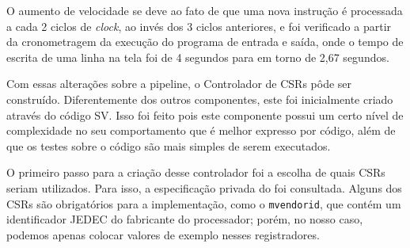 \documentclass[
	12pt,				%
	openright,			%
	oneside,			%
	a4paper,			%
	english,			%
	french,				%
	spanish,			%
	brazil,				%
	]{abntex2}
\begin{document}
O aumento de velocidade se deve ao fato de que uma nova instrução é processada a cada 2 ciclos de \textit{clock}, ao invés dos 3 ciclos anteriores, e foi verificado a partir da cronometragem da execução do programa de entrada e saída, onde o tempo de escrita de uma linha na tela foi de 4 segundos para em torno de 2,67 segundos.

Com essas alterações sobre a pipeline, o Controlador de CSRs pôde ser construído. Diferentemente dos outros componentes, este foi inicialmente criado através do código SV. Isso foi feito pois este componente possui um certo nível de complexidade no seu comportamento que é melhor expresso por código, além de que os testes sobre o código são mais simples de serem executados.

O primeiro passo para a criação desse controlador foi a escolha de quais CSRs seriam utilizados. Para isso, a especificação privada do  foi consultada. Alguns dos CSRs são obrigatórios para a implementação, como o \texttt{mvendorid}, que contém um identificador JEDEC do fabricante do processador; porém, no nosso caso, podemos apenas colocar valores de exemplo nesses registradores.
\end{document}
